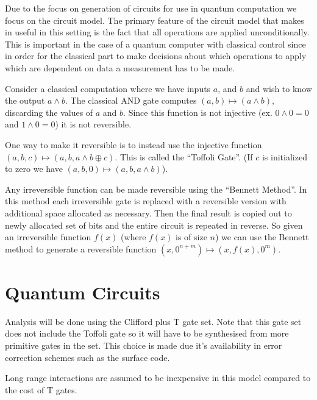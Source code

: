 Due to the focus on generation of circuits for use in quantum computation we
focus on the circuit model. The primary feature of the circuit model that makes
in useful in this setting is the fact that all operations are applied
unconditionally. This is important in the case of a quantum computer with
classical control since in order for  the classical part to make decisions about
which operations to apply which are dependent on data a measurement has to be made.

Consider a classical computation where we have inputs $a$, and $b$ and wish to
know the output $a\land b$.  The classical AND gate computes $(a,b)\mapsto
(a\land b)$, discarding the values of $a$ and $b$.  Since this function is not
injective (ex. $0\land 0 = 0$ and $1 \land 0 = 0$) it is not reversible.

One way to make it reversible is to instead use the injective function
$(a,b,c) \mapsto (a,b,a\land b \oplus c)$. This is called the ``Toffoli Gate''.
(If $c$ is initialized to zero we have $(a,b,0) \mapsto (a,b,a\land b)$).

Any irreversible function can be made reversible using the ``Bennett
Method''\cite{Bennett:73}. In this method each irreversible gate is replaced
with a reversible version with additional space allocated as necessary. Then the
final result is copied out to newly allocated set of bits and the entire circuit
is repeated in reverse. So given an irreversible function $f(x)$ (where $f(x)$
is of size $n$) we can use the Bennett method to generate a reversible function
$(x,0^{n+m}) \mapsto (x,f(x),0^m)$.


\section{Quantum Circuits}

Analysis will be done using the Clifford plus T gate set.  Note that this gate
set does not include the Toffoli gate so it will have to be synthesised from
more primitive gates in the set.  This choice is made due it's availability in
error correction schemes such as the surface code\cites{}.

Long range interactions are assumed to be inexpensive in this model compared to
the cost of T gates.

